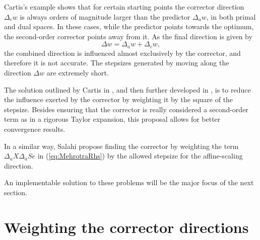 Cartis's example \cite{Cartis04} shows that for certain 
starting points the corrector direction $\Delta_c w$
is always orders of magnitude larger than the predictor $\Delta_a w$, in both 
primal and dual spaces.
In these cases, while the predictor points towards 
the optimum, the second-order corrector points away from it.
As the final direction is given by
\[
\Delta w = \Delta_a w  +\Delta_c w,
\]
the combined direction is influenced almost exclusively by the corrector, 
and therefore it is not accurate. 
The stepsizes generated by moving along the direction $\Delta w$
are extremely short.

The solution outlined by Cartis in \cite{Cartis04}, and then further 
developed in \cite{Cartis05}, is to reduce the influence exerted by 
the corrector by weighting it by the square of the stepsize. 
Besides ensuring that the corrector is really considered 
a second-order term as in a rigorous Taylor expansion, 
this proposal allows for better convergence results.


In a similar way, Salahi \etal \cite{SalahiPengTerlaky} propose finding 
the corrector by weighting the term $\Delta_a X \Delta_a S e$ in 
(\ref{eq:MehrotraRhs}) by the allowed stepsize for the affine-scaling 
direction.


An implementable solution to these problems will be the
major focus of the next section.

%
%
\section{Weighting the corrector directions}


